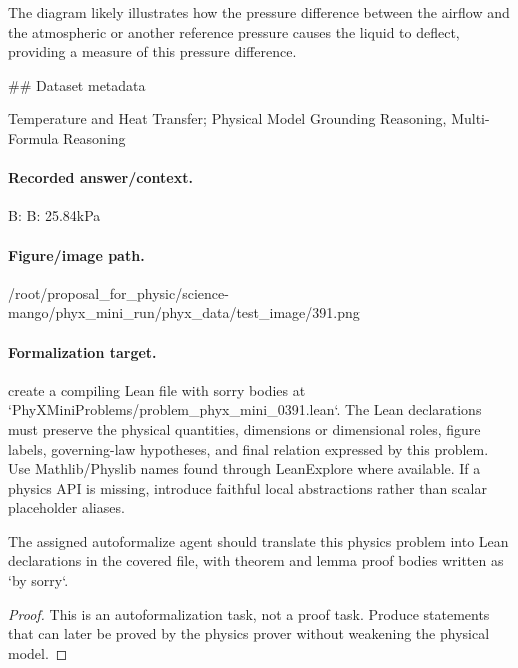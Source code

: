The diagram likely illustrates how the pressure difference between the airflow and the atmospheric or another reference pressure causes the liquid to deflect, providing a measure of this pressure difference.

\#\# Dataset metadata

Temperature and Heat Transfer; Physical Model Grounding Reasoning, Multi-Formula Reasoning

\paragraph{Recorded answer/context.}
B: B: 25.84kPa

\paragraph{Figure/image path.}
/root/proposal\_for\_physic/science-mango/phyx\_mini\_run/phyx\_data/test\_image/391.png

\paragraph{Formalization target.}
create a compiling Lean file with sorry bodies at `PhyXMiniProblems/problem\_phyx\_mini\_0391.lean`. The Lean declarations must preserve the physical quantities, dimensions or dimensional roles, figure labels, governing-law hypotheses, and final relation expressed by this problem.
Use Mathlib/Physlib names found through LeanExplore where available. If a physics API is missing, introduce faithful local abstractions rather than scalar placeholder aliases.

\begin{theorem}
\label{thm:physics:phyx_mini_0391:target}
The assigned autoformalize agent should translate this physics problem into Lean declarations in the covered file, with theorem and lemma proof bodies written as `by sorry`.
\end{theorem}
\begin{proof}
This is an autoformalization task, not a proof task. Produce statements that can later be proved by the physics prover without weakening the physical model.
\end{proof}

